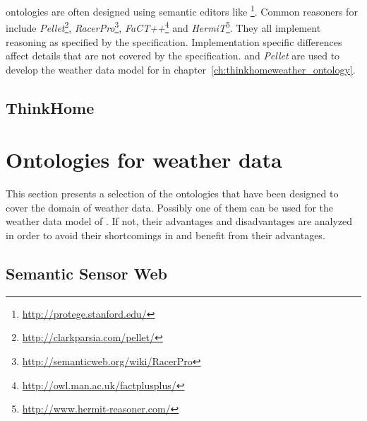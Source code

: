 
 ontologies are often designed using semantic editors like \protege\footnote{\href{http://protege.stanford.edu/}{http://protege.stanford.edu/}}. Common reasoners for  include \emph{Pellet}\footnote{\href{http://clarkparsia.com/pellet/}{http://clarkparsia.com/pellet/}}, \emph{RacerPro}\footnote{\href{http://semanticweb.org/wiki/RacerPro}{http://semanticweb.org/wiki/RacerPro}}, \emph{FaCT++}\footnote{\href{http://owl.man.ac.uk/factplusplus/}{http://owl.man.ac.uk/factplusplus/}} and \emph{HermiT}\footnote{\href{http://www.hermit-reasoner.com/}{http://www.hermit-reasoner.com/}}. They all implement reasoning as specified by the  specification. Implementation specific differences affect details that are not covered by the  specification. \protege and \emph{Pellet} are used to develop the weather data model for \thinkhome in chapter~\ref{ch:thinkhomeweather_ontology}.


\subsection{ThinkHome}


\section{Ontologies for weather data}
\label{sec:weather_ontologies}

This section presents a selection of the ontologies that have been designed to cover the domain of weather data. Possibly one of them can be used for the weather data model of \thinkhome. If not, their advantages and disadvantages are analyzed in order to avoid their shortcomings in \thinkhome and benefit from their advantages.


\subsection{Semantic Sensor Web}

